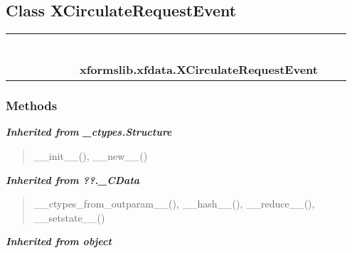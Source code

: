 \subsection{Class XCirculateRequestEvent}

    \label{xformslib:xfdata:XCirculateRequestEvent}
\begin{tabular}{cccccccccc}
\multicolumn{2}{r}{\settowidth{\BCL}{object}\multirow{2}{\BCL}{object}}
&&
&&
&&
  \\\cline{3-3}
  &&\multicolumn{1}{c|}{}
&&
&&
&&
  \\
\multicolumn{4}{r}{\settowidth{\BCL}{??.\_CData}\multirow{2}{\BCL}{??.\_CData}}
&&
&&
  \\\cline{5-5}
  &&&&\multicolumn{1}{c|}{}
&&
&&
  \\
\multicolumn{6}{r}{\settowidth{\BCL}{\_ctypes.Structure}\multirow{2}{\BCL}{\_ctypes.Structure}}
&&
  \\\cline{7-7}
  &&&&&&\multicolumn{1}{c|}{}
&&
  \\
&&&&&&\multicolumn{2}{l}{\textbf{xformslib.xfdata.XCirculateRequestEvent}}
\end{tabular}



  \subsubsection{Methods}


\large{\textbf{\textit{Inherited from \_ctypes.Structure}}}

\begin{quote}
\_\_init\_\_(), \_\_new\_\_()
\end{quote}

\large{\textbf{\textit{Inherited from ??.\_CData}}}

\begin{quote}
\_\_ctypes\_from\_outparam\_\_(), \_\_hash\_\_(), \_\_reduce\_\_(), \_\_setstate\_\_()
\end{quote}

\large{\textbf{\textit{Inherited from object}}}

